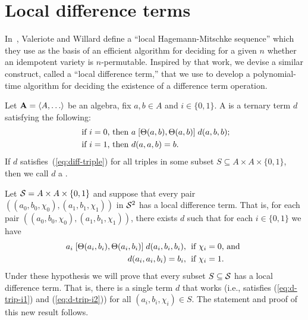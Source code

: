 \section{Local difference terms}
\label{sec:local-diff-terms}
In~\cite{MR3239624},
Valeriote and Willard define %
a ``local Hagemann-Mitschke sequence'' which they use as the basis of
an efficient algorithm for deciding for a given $n$ whether an idempotent
variety is $n$-permutable. 
Inspired by that work, we devise a similar construct, called
a ``local difference term,'' that we use to develop a polynomial-time
algorithm for deciding the existence of a difference term operation.



Let $\bA=\< A, \dots\>$ be an algebra, fix $a, b \in A$ and
$i \in \{0,1\}$.
A  is a ternary term $d$ satisfying the following:
\begin{align}
\text{ if $i=0$, then } & a \comm{\Cg(a,b)}{\Cg(a,b)} d(a,b,b); \label{eq:diff-triple}\\
\text{ if $i=1$, then } &d(a,a,b) = b. \nonumber
\end{align}
If $d$ satisfies~(\ref{eq:diff-triple}) for all triples
in some subset $S\subseteq A \times A \times \{0,1\}$, then we call $d$
a .

Let 
$\mathcal{S} = A \times A \times \{0,1\}$ and
suppose that every pair
$((a_0, b_0, \chi_0), (a_1, b_1, \chi_1))$
in $\mathcal{S}^2$ has a local difference term.
That is, for each pair $((a_0, b_0, \chi_0), (a_1, b_1, \chi_1))$, there exists
$d$ such that for each $i \in \{0,1\}$ we have
\begin{align}
  a_i \comm{\Cg(a_i,b_i)}{\Cg(a_i,b_i)} d(a_i,b_i,b_i), & \;
  \text{ if $\chi_i=0$, and }  \label{eq:d-trip-i1}\\
  d(a_i,a_i,b_i) =b_i, & \;
  \text{ if $\chi_i=1$.}\label{eq:d-trip-i2} %
\end{align}
Under these hypothesis we will prove that every subset $S\subseteq \mathcal{S}$
has a local difference term.
That is, there is a single term $d$ that works (i.e., satisfies
(\ref{eq:d-trip-i1}) and (\ref{eq:d-trip-i2})) for all $(a_i, b_i, \chi_i) \in S$.
The statement and proof of this new result follows.

